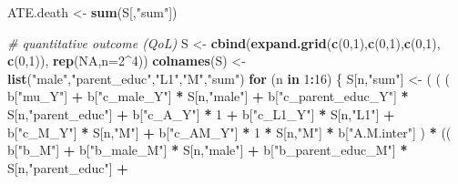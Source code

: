 \documentclass[
]{book}
\newenvironment{Shaded}{\begin{snugshade}}{\end{snugshade}}
\newcommand{\AttributeTok}[1]{\textcolor[rgb]{0.13,0.29,0.53}{#1}}
\newcommand{\CommentTok}[1]{\textcolor[rgb]{0.56,0.35,0.01}{\textit{#1}}}
\newcommand{\ConstantTok}[1]{\textcolor[rgb]{0.56,0.35,0.01}{#1}}
\newcommand{\ControlFlowTok}[1]{\textcolor[rgb]{0.13,0.29,0.53}{\textbf{#1}}}
\newcommand{\DecValTok}[1]{\textcolor[rgb]{0.00,0.00,0.81}{#1}}
\newcommand{\FunctionTok}[1]{\textcolor[rgb]{0.13,0.29,0.53}{\textbf{#1}}}
\newcommand{\NormalTok}[1]{#1}
\newcommand{\OtherTok}[1]{\textcolor[rgb]{0.56,0.35,0.01}{#1}}
\newcommand{\SpecialCharTok}[1]{\textcolor[rgb]{0.81,0.36,0.00}{\textbf{#1}}}
\newcommand{\StringTok}[1]{\textcolor[rgb]{0.31,0.60,0.02}{#1}}
\begin{document}
\begin{Shaded}
\begin{Highlighting}[]
\NormalTok{ATE.death }\OtherTok{\textless{}{-}} \FunctionTok{sum}\NormalTok{(S[,}\StringTok{"sum"}\NormalTok{])}


\CommentTok{\# quantitative outcome (QoL)}
\NormalTok{S }\OtherTok{\textless{}{-}} \FunctionTok{cbind}\NormalTok{(}\FunctionTok{expand.grid}\NormalTok{(}\FunctionTok{c}\NormalTok{(}\DecValTok{0}\NormalTok{,}\DecValTok{1}\NormalTok{),}\FunctionTok{c}\NormalTok{(}\DecValTok{0}\NormalTok{,}\DecValTok{1}\NormalTok{),}\FunctionTok{c}\NormalTok{(}\DecValTok{0}\NormalTok{,}\DecValTok{1}\NormalTok{), }\FunctionTok{c}\NormalTok{(}\DecValTok{0}\NormalTok{,}\DecValTok{1}\NormalTok{)), }\FunctionTok{rep}\NormalTok{(}\ConstantTok{NA}\NormalTok{,}\AttributeTok{n=}\DecValTok{2}\SpecialCharTok{\^{}}\DecValTok{4}\NormalTok{))}
\FunctionTok{colnames}\NormalTok{(S) }\OtherTok{\textless{}{-}} \FunctionTok{list}\NormalTok{(}\StringTok{"male"}\NormalTok{,}\StringTok{"parent\_educ"}\NormalTok{,}\StringTok{"L1"}\NormalTok{,}\StringTok{"M"}\NormalTok{,}\StringTok{"sum"}\NormalTok{)}
\ControlFlowTok{for}\NormalTok{ (n }\ControlFlowTok{in} \DecValTok{1}\SpecialCharTok{:}\DecValTok{16}\NormalTok{) \{}
\NormalTok{  S[n,}\StringTok{"sum"}\NormalTok{] }\OtherTok{\textless{}{-}}\NormalTok{ ( ( ( b[}\StringTok{"mu\_Y"}\NormalTok{] }\SpecialCharTok{+} 
\NormalTok{                        b[}\StringTok{"c\_male\_Y"}\NormalTok{] }\SpecialCharTok{*}\NormalTok{ S[n,}\StringTok{"male"}\NormalTok{] }\SpecialCharTok{+} 
\NormalTok{                        b[}\StringTok{"c\_parent\_educ\_Y"}\NormalTok{] }\SpecialCharTok{*}\NormalTok{ S[n,}\StringTok{"parent\_educ"}\NormalTok{] }\SpecialCharTok{+}
\NormalTok{                        b[}\StringTok{"c\_A\_Y"}\NormalTok{] }\SpecialCharTok{*} \DecValTok{1} \SpecialCharTok{+}
\NormalTok{                        b[}\StringTok{"c\_L1\_Y"}\NormalTok{] }\SpecialCharTok{*}\NormalTok{ S[n,}\StringTok{"L1"}\NormalTok{] }\SpecialCharTok{+}
\NormalTok{                        b[}\StringTok{"c\_M\_Y"}\NormalTok{] }\SpecialCharTok{*}\NormalTok{ S[n,}\StringTok{"M"}\NormalTok{] }\SpecialCharTok{+} 
\NormalTok{                        b[}\StringTok{"c\_AM\_Y"}\NormalTok{] }\SpecialCharTok{*} \DecValTok{1} \SpecialCharTok{*}\NormalTok{ S[n,}\StringTok{"M"}\NormalTok{] }\SpecialCharTok{*}\NormalTok{ b[}\StringTok{"A.M.inter"}\NormalTok{] ) }\SpecialCharTok{*}
\NormalTok{                      (( b[}\StringTok{"b\_M"}\NormalTok{] }\SpecialCharTok{+} 
\NormalTok{                           b[}\StringTok{"b\_male\_M"}\NormalTok{] }\SpecialCharTok{*}\NormalTok{ S[n,}\StringTok{"male"}\NormalTok{] }\SpecialCharTok{+} 
\NormalTok{                           b[}\StringTok{"b\_parent\_educ\_M"}\NormalTok{] }\SpecialCharTok{*}\NormalTok{ S[n,}\StringTok{"parent\_educ"}\NormalTok{] }\SpecialCharTok{+} 

\end{Highlighting}
\end{Shaded}
\end{document}
